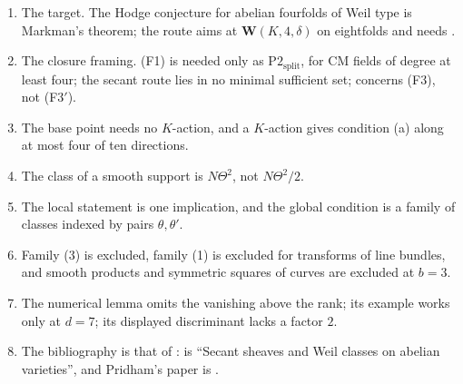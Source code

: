 \documentclass[11pt]{amsart}
\theoremstyle{definition}
\theoremstyle{remark}
\begin{document}
\begin{enumerate}[label=(\arabic*),leftmargin=2.2em]
\item The target. The Hodge conjecture for abelian fourfolds of Weil type is
  Markman's theorem; the route aims at $\mathbf{W}(K,4,\delta)$ on eightfolds
  and needs \cite[Question~11.4]{Mar25b}.
\item The closure framing. (F1) is needed only as $\mathrm{P2}_{\mathrm{split}}$,
  for CM fields of degree at least four; the secant route lies in no minimal
  sufficient set; \cite[Proposition~20.35]{BMB} concerns (F3), not (F3$'$).
\item The base point needs no $K$-action, and a $K$-action gives condition (a)
  along at most four of ten directions.
\item The class of a smooth support is $N\Theta^{2}$, not $N\Theta^{2}/2$.
\item The local statement is one implication, and the global condition is a
  family of classes indexed by pairs $\theta,\theta'$.
\item Family (3) is excluded, family (1) is excluded for transforms of line
  bundles, and smooth products and symmetric squares of curves are excluded
  at $b=3$.
\item The numerical lemma omits the vanishing above the rank; its example
  works only at $d=7$; its displayed discriminant lacks a factor $2$.
\item The bibliography is that of \cite{BMB}: \cite{Mar25b} is ``Secant
  sheaves and Weil classes on abelian varieties'', and Pridham's paper is
  \cite{Pri24}.
\end{enumerate}
\end{document}
